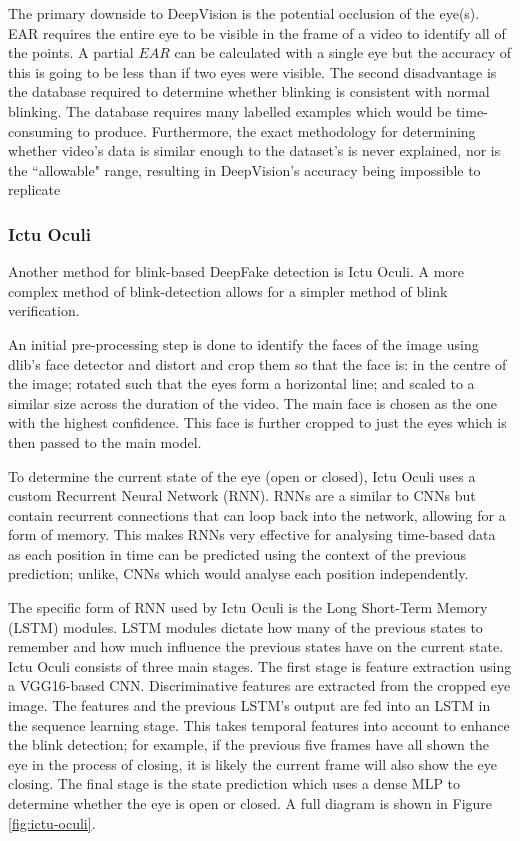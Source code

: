 The primary downside to DeepVision is the potential occlusion of the eye(s). EAR requires the entire eye to be visible in the frame of a video to identify all of the points. A partial $EAR$ can be calculated with a single eye but the accuracy of this is going to be less than if two eyes were visible. The second disadvantage is the database required to determine whether blinking is consistent with normal blinking. The database requires many labelled examples which would be time-consuming to produce. Furthermore, the exact methodology for determining whether video's data is similar enough to the dataset's is never explained, nor is the ``allowable" range, resulting in DeepVision's accuracy being impossible to replicate

\subsubsection{Ictu Oculi}

Another method for blink-based DeepFake detection is Ictu Oculi\cite{li2018ictu}. A more complex method of blink-detection allows for a simpler method of blink verification. 

An initial pre-processing step is done to identify the faces of the image using dlib's\cite{king2009dlib} face detector and distort and crop them so that the face is: in the centre of the image; rotated such that the eyes form a horizontal line; and scaled to a similar size across the duration of the video. The main face is chosen as the one with the highest confidence. This face is further cropped to just the eyes which is then passed to the main model.

To determine the current state of the eye (open or closed), Ictu Oculi uses a custom Recurrent Neural Network (RNN). RNNs are a similar to CNNs but contain recurrent connections that can loop back into the network, allowing for a form of memory. This makes RNNs very effective for analysing time-based data as each position in time can be predicted using the context of the previous prediction; unlike, CNNs which would analyse each position independently.

The specific form of RNN used by Ictu Oculi is the Long Short-Term Memory (LSTM) modules\cite{hochreiter1997long}. LSTM modules dictate how many of the previous states to remember and how much influence the previous states have on the current state. Ictu Oculi consists of three main stages. The first stage is feature extraction using a VGG16-based CNN. Discriminative features are extracted from the cropped eye image. The features and the previous LSTM's output are fed into an LSTM in the sequence learning stage. This takes temporal features into account to enhance the blink detection; for example, if the previous five frames have all shown the eye in the process of closing, it is likely the current frame will also show the eye closing. The final stage is the state prediction which uses a dense MLP to determine whether the eye is open or closed. A full diagram is shown in Figure \ref{fig:ictu-oculi}.

